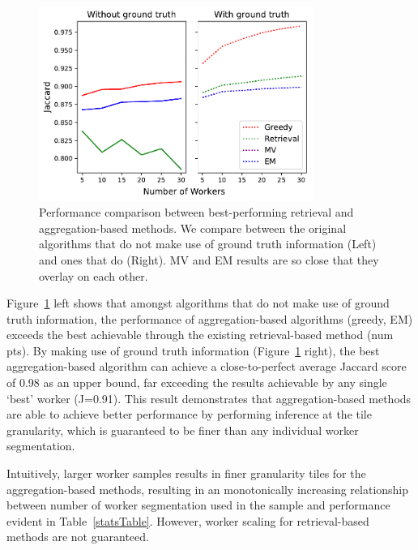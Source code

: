 \begin{figure}[h!]
   \vspace{-7pt}
   \centering
   \includegraphics[width=0.8\textwidth]{plots/Retrieval_vs_Aggregation.pdf}
   \caption{Performance comparison between best-performing retrieval and aggregation-based methods. We compare between the original algorithms that do not make use of ground truth information (Left) and ones that do (Right). MV and EM results are so close that they overlay on each other.}
   \label{retrieval_vs_aggregation}   
   \setlength{\belowcaptionskip}{-15pt}
\end{figure} 

\par \noindent Figure~\ref{retrieval_vs_aggregation} left shows that amongst algorithms that do not make use of ground truth information, the performance of aggregation-based algorithms (greedy, EM) exceeds the best achievable through the existing retrieval-based method (num pts). By making use of ground truth information (Figure~\ref{retrieval_vs_aggregation} right), the best aggregation-based algorithm can achieve a close-to-perfect average Jaccard score of 0.98 as an upper bound, far exceeding the results achievable by any single `best' worker (J=0.91). This result demonstrates that aggregation-based methods are able to achieve better performance by performing inference at the tile granularity, which is guaranteed to be finer than any individual worker segmentation. 

\par \noindent Intuitively, larger worker samples results in finer granularity tiles for the aggregation-based methods, resulting in an monotonically increasing relationship between number of worker segmentation used in the sample and performance evident in Table~\ref{statsTable}. However, worker scaling for retrieval-based methods are not guaranteed.

